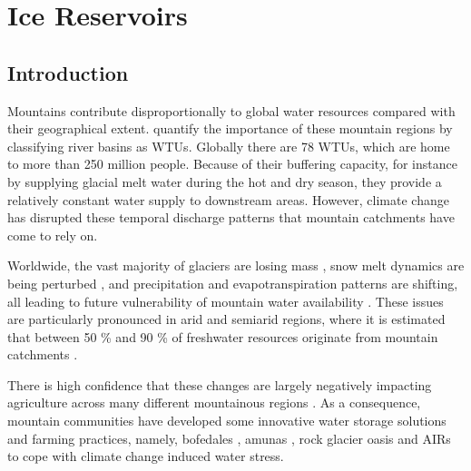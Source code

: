 \chapter{Ice Reservoirs}



\section{Introduction}

Mountains contribute disproportionally to global water resources compared with their geographical extent.
\citet{immerzeelImportanceVulnerabilityWorld2020} quantify the importance of these mountain regions by
classifying river basins as \ac{WTUs}. Globally there are 78 \ac{WTUs}, which are home to more than 250 million
people. Because of their buffering capacity, for instance by supplying glacial melt water during the hot and dry
season, they provide a relatively constant water supply to downstream areas. However, climate change has
disrupted these temporal discharge patterns that mountain catchments have come to rely on.

Worldwide, the vast majority of glaciers are losing mass \citep{zempGlobalGlacierMass2019a}, snow melt dynamics
are being perturbed \citep{mukhopadhyayReevaluationSnowmeltGlacial2015, hammondGlobalSnowZone2018}, and
precipitation and evapotranspiration patterns are shifting, all leading to future vulnerability of mountain
water availability \citep{lutzConsistentIncreaseHigh2014}. These issues are particularly pronounced in arid and
semiarid regions, where it is estimated that between 50 \% and 90 \% of freshwater resources originate from
mountain catchments \citep{mukhopadhyayReevaluationSnowmeltGlacial2015, messerliMountainsWorldVulnerable2004}.

There is high confidence that these changes are largely negatively impacting agriculture across many different
mountainous regions \citep{ipccCrossChapterPaperMountains2022}. As a consequence, mountain communities have
developed some innovative water storage solutions and farming practices, namely, bofedales
\citep{monge-salazarEcohydrologyEcosystemServices2022}, amunas
\citep{ochoa-tocachiPotentialContributionsPreInca2019}, rock glacier oasis \citep{pandeyRockGlacierOasis2022}
and \ac{AIRs} \citep{wangchukIceStupaCompetition2020} to cope with climate change induced water stress.

